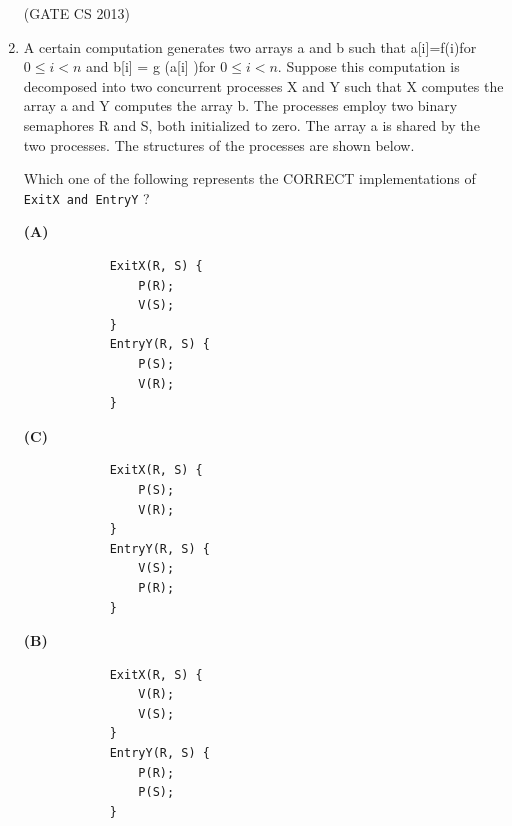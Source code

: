 \documentclass[a4paper, 11pt]{article}
\begin{document}
\begin{enumerate}
     \hfill (GATE CS 2013)

     \item A certain computation generates two arrays a and b such that a[i]=f(i)for $0 \leq i < n$ and b[i] = g (a[i] )for $0 \leq i < n$. Suppose this computation is decomposed into two concurrent processes X and Y such that X computes the array a and Y computes the array b. The processes employ two binary semaphores R and S, both initialized to zero. The array a is shared by the two processes. The structures of the processes are shown below.
     \begin{enumerate}[label=]
     \end{enumerate}
     Which one of the following represents the CORRECT implementations of \texttt{ExitX and EntryY} ?
            \begin{minipage}{0.45\textwidth}
            \textbf{(A)}
            \begin{lstlisting}
            ExitX(R, S) {
                P(R);
                V(S);
            }
            EntryY(R, S) {
                P(S);
                V(R);
            }
            \end{lstlisting}
            
            \medskip
            \textbf{(C)}
            \begin{lstlisting}
            ExitX(R, S) {
                P(S);
                V(R);
            }
            EntryY(R, S) {
                V(S);
                P(R);
            }
            \end{lstlisting}
            \end{minipage}
            \hfill
            \begin{minipage}{0.45\textwidth}
            \textbf{(B)}
            \begin{lstlisting}
            ExitX(R, S) {
                V(R);
                V(S);
            }
            EntryY(R, S) {
                P(R);
                P(S);
            }
            \end{lstlisting}
            

\end{minipage}
\end{enumerate}
\end{document}
